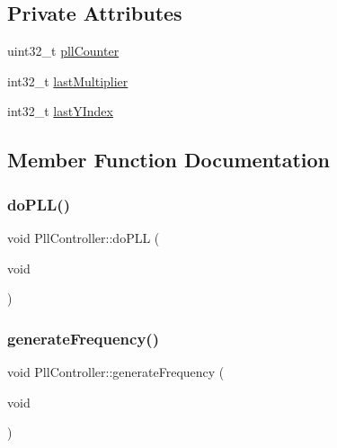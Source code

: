 \subsection*{Private Attributes}
\begin{DoxyCompactItemize}
\item 
uint32\+\_\+t \mbox{\hyperlink{class_pll_controller_ad846804aa993651e07be4b02e3741949}{pll\+Counter}}
\item 
int32\+\_\+t \mbox{\hyperlink{class_pll_controller_a881de78c8a63fa5316b77d8de03738c4}{last\+Multiplier}}
\item 
int32\+\_\+t \mbox{\hyperlink{class_pll_controller_abf2096b13e0ccbef733fcf81e010adee}{last\+Y\+Index}}
\end{DoxyCompactItemize}


\subsection{Member Function Documentation}
\mbox{\label{class_pll_controller_adb2ddd1018a400f09933b8349abbffc8}} 
\subsubsection{\texorpdfstring{do\+P\+L\+L()}{doPLL()}}
{\footnotesize\ttfamily void Pll\+Controller\+::do\+P\+LL (\begin{DoxyParamCaption}\item[{void}]{ }\end{DoxyParamCaption})}

\mbox{\label{class_pll_controller_aad1cfc35168ae3067abc452ab47d5806}} 
\subsubsection{\texorpdfstring{generate\+Frequency()}{generateFrequency()}}
{\footnotesize\ttfamily void Pll\+Controller\+::generate\+Frequency (\begin{DoxyParamCaption}\item[{void}]{ }\end{DoxyParamCaption})}

